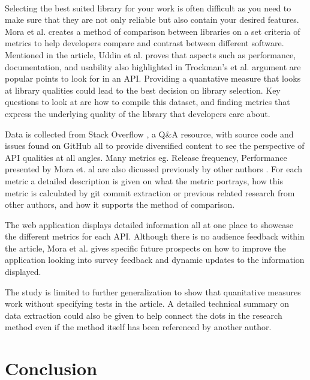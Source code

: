 \documentclass[12pt]{article}
\begin{document}
\paragraph{}
Selecting the best suited library for your work is often difficult as you need to make sure that they are not only reliable but also contain your desired features.
Mora et al. \cite{metrics} creates a method of comparison between libraries on a set criteria of metrics to help developers
compare and contrast between different software. Mentioned in the article, Uddin et al. \cite{analogical} proves that aspects
such as performance, documentation, and usability also highlighted in Trockman's et al. \cite{githubbadges} argument are
popular points to look for in an API.
Providing a quantative measure that looks at library qualities could lead to the best decision on library selection.
Key questions to look at are how to compile this dataset, and finding metrics that express the underlying quality of the library that developers care about.

Data is collected from Stack Overflow \cite{stackoverflow}, a Q\&A resource, with source code and issues found on GitHub \cite{github} all to provide
diversified content to see the perspective of API qualities at all angles. Many metrics eg. Release frequency, Performance presented by Mora et. al \cite{metrics} are also
dicussed previously by other authors \cite{apiwave,analogical,githubbadges,opinerarticle}.
For each metric a detailed description is given on what the metric portrays, how this metric is calculated by git commit extraction or previous related research from other authors,
and how it supports the method of comparison.

The web application displays detailed information all at one place to showcase the different metrics for each API. 
Although there is no audience feedback within the article, Mora et al. \cite{metrics} gives specific future prospects on how
to improve the application looking into survey feedback and dynamic updates to the information displayed. 

The study is limited to further generalization to show that quanitative measures work without specifying tests in the article. 
A detailed technical summary on data extraction could also be given to help connect the dots in the research method even if the method itself has been referenced by another author.


\newpage 
\section{Conclusion}
\end{document}
